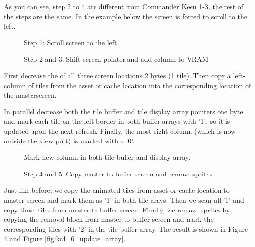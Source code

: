 \documentclass[book.tex]{subfiles}
\begin{document}
As you can see, step 2 to 4 are different from Commander Keen 1-3, the rest of the steps are the same. In the example below the screen is forced to scroll to the left.
\\

\begin{figure}[H]
\centering
 \caption{Step 1: Scroll screen to the left}
 \label{fig:kc4_6_start}
\end{figure}

\begin{figure}[H]
\centering
 \caption{Step 2 and 3: Shift screen pointer and add column to VRAM}
 \label{fig:kc4_6_add_column}
\end{figure}


First decrease the  of all three screen locations 2 bytes (1 tile). Then copy a left-column of tiles from the asset or cache location into the corresponding location of the masterscreen.\\
\par
In parallel decrease both the tile buffer and tile display array pointers one byte and mark each tile on the left border in both buffer arrays with '1', so it is updated upon the next refresh.
Finally, the most right column (which is now outside the view port) is marked with a '0'.

\begin{figure}[H]
\centering
 \caption{Mark new column in both tile buffer and display array.}
 \label{fig:kc4_6_tile_final}
\end{figure}


\begin{figure}[H]
\centering
 \caption{Step 4 and 5: Copy master to buffer screen and remove sprites}
 \label{fig:kc4_6_update_buffer}
\end{figure}



Just like before, we copy the animated tiles from asset or cache location to master screen and mark them as '1' in both tile arays. Then we scan all '1' and copy those tiles from master to buffer screen. Finally, we remove sprites by copying the removal block from master to buffer screen and mark the corresponding tiles with '2' in the tile buffer array. The result is shown in Figure \ref{fig:kc4_6_update_buffer} and Figure \ref{fig:kc4_6_update_array}.
\end{document}
